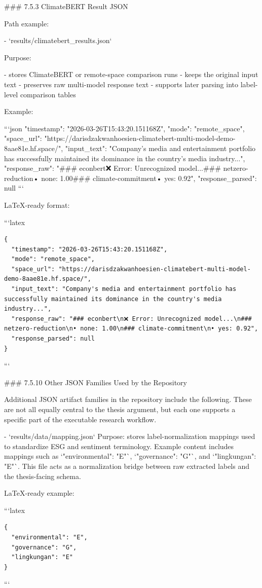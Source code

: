 ### 7.5.3 ClimateBERT Result JSON

Path example:

- `results/climatebert_results.json`

Purpose:

- stores ClimateBERT or remote-space comparison runs
- keeps the original input text
- preserves raw multi-model response text
- supports later parsing into label-level comparison tables

Example:

```json
{
  "timestamp": "2026-03-26T15:43:20.151168Z",
  "mode": "remote_space",
  "space_url": "https://darisdzakwanhoesien-climatebert-multi-model-demo-8aae81e.hf.space/",
  "input_text": "Company's media and entertainment portfolio has successfully maintained its dominance in the country's media industry...",
  "response_raw": "### econbert\n❌ Error: Unrecognized model...\n### netzero-reduction\n• none: 1.00\n### climate-commitment\n• yes: 0.92",
  "response_parsed": null
}
```

LaTeX-ready format:

```latex
\begin{verbatim}
{
  "timestamp": "2026-03-26T15:43:20.151168Z",
  "mode": "remote_space",
  "space_url": "https://darisdzakwanhoesien-climatebert-multi-model-demo-8aae81e.hf.space/",
  "input_text": "Company's media and entertainment portfolio has successfully maintained its dominance in the country's media industry...",
  "response_raw": "### econbert\n❌ Error: Unrecognized model...\n### netzero-reduction\n• none: 1.00\n### climate-commitment\n• yes: 0.92",
  "response_parsed": null
}
\end{verbatim}
```

### 7.5.10 Other JSON Families Used by the Repository

Additional JSON artifact families in the repository include the following. These are not all equally central to the thesis argument, but each one supports a specific part of the executable research workflow.

- `results/data/mapping.json`
  Purpose:
  stores label-normalization mappings used to standardize ESG and sentiment terminology.
  Example content includes mappings such as `"environmental": "E"`, `"governance": "G"`, and `"lingkungan": "E"`. This file acts as a normalization bridge between raw extracted labels and the thesis-facing schema.

  LaTeX-ready example:

```latex
\begin{verbatim}
{
  "environmental": "E",
  "governance": "G",
  "lingkungan": "E"
}
\end{verbatim}
```

